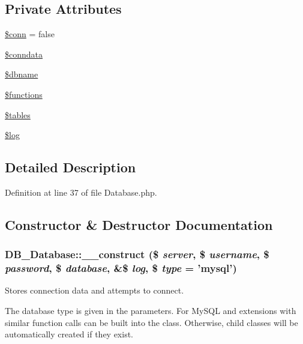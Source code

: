 \subsection*{Private Attributes}
\begin{DoxyCompactItemize}
\item 
\hyperlink{classDB__Database_a8cc2ee198b44ecef38ffaaef255bee93}{\$conn} = false
\item 
\hyperlink{classDB__Database_a052600d78f57d7af178e13ab7992949a}{\$conndata}
\item 
\hyperlink{classDB__Database_accd8f5296560fb4ce0cc8aa294b3951e}{\$dbname}
\item 
\hyperlink{classDB__Database_acd9a4a4dae5229e946ab585b919e3563}{\$functions}
\item 
\hyperlink{classDB__Database_a96d1439bc2c2a8edfaf03b593898b3f2}{\$tables}
\item 
\hyperlink{classDB__Database_a707cb0823a2ad42054c4ab650b2dd01b}{\$log}
\end{DoxyCompactItemize}


\subsection{Detailed Description}


Definition at line 37 of file Database.php.

\subsection{Constructor \& Destructor Documentation}
\hypertarget{classDB__Database_aa7b0b5a7fa10d3928e1b95664662a9a2}{
\subsubsection[{\_\-\_\-construct}]{\setlength{\rightskip}{0pt plus 5cm}DB\_\-Database::\_\-\_\-construct (\$ {\em server}, \/  \$ {\em username}, \/  \$ {\em password}, \/  \$ {\em database}, \/  \&\$ {\em log}, \/  \$ {\em type} = {\ttfamily 'mysql'})}}
\label{d3/d63/classDB__Database_aa7b0b5a7fa10d3928e1b95664662a9a2}
Stores connection data and attempts to connect.

The database type is given in the parameters. For MySQL and extensions with similar function calls can be built into the class. Otherwise, child classes will be automatically created if they exist.


